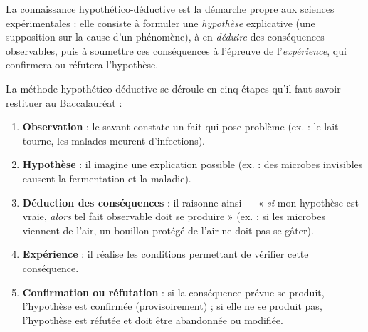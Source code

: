 \documentclass[11pt]{article}
\newcommand{\cle}[1]{{\popxbold\color{popdark}#1}}
\begin{document}
\begin{definition}
La \cle{connaissance hypothético-déductive} est la démarche propre aux sciences expérimentales : elle consiste à formuler une \emph{hypothèse} explicative (une supposition sur la cause d'un phénomène), à en \emph{déduire} des conséquences observables, puis à soumettre ces conséquences à l'épreuve de l'\emph{expérience}, qui confirmera ou réfutera l'hypothèse.
\end{definition}

\begin{methode}
La méthode hypothético-déductive se déroule en cinq étapes qu'il faut savoir restituer au Baccalauréat :
\begin{enumerate}
\item \textbf{Observation} : le savant constate un fait qui pose problème (ex. : le lait tourne, les malades meurent d'infections).
\item \textbf{Hypothèse} : il imagine une explication possible (ex. : des microbes invisibles causent la fermentation et la maladie).
\item \textbf{Déduction des conséquences} : il raisonne ainsi — « \emph{si} mon hypothèse est vraie, \emph{alors} tel fait observable doit se produire » (ex. : si les microbes viennent de l'air, un bouillon protégé de l'air ne doit pas se gâter).
\item \textbf{Expérience} : il réalise les conditions permettant de vérifier cette conséquence.
\item \textbf{Confirmation ou réfutation} : si la conséquence prévue se produit, l'hypothèse est confirmée (provisoirement) ; si elle ne se produit pas, l'hypothèse est réfutée et doit être abandonnée ou modifiée.
\end{enumerate}
\end{methode}
\end{document}
